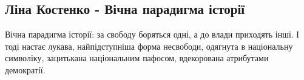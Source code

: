  
 
 

\subsection{Ліна Костенко - Вічна парадигма історії}

Вічна парадигма історії: за свободу боряться одні, а до влади приходять інші. І
тоді настає лукава, найпідступніша форма несвободи, одягнута в національну
символіку, зацитькана національним пафосом, вдекорована атрибутами демократії.
